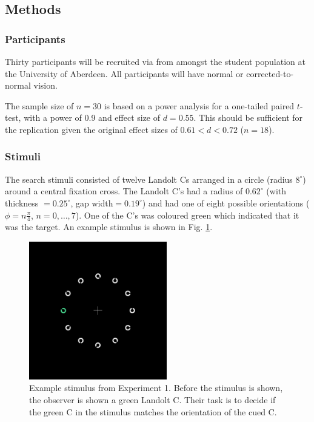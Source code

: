 \documentclass[smallextended]{svjour3}       %
\begin{document}
\subsection{Methods}

\subsubsection{Participants}

Thirty participants will be recruited via from amongst the student population at the University of Aberdeen. All participants will have normal or corrected-to-normal vision. 

The sample size of $n=30$ is based on a power analysis for a one-tailed paired $t$-test, with a power of 0.9 and effect size of $d=0.55$. This should be sufficient for the replication given the original effect sizes of $0.61<d<0.72$ ($n=18$).

\subsubsection{Stimuli}

The search stimuli consisted of twelve Landolt Cs arranged in a circle (radius $8^{\circ}$) around a central fixation cross. The Landolt C's had a radius of $0.62^{\circ}$ (with thickness $=0.25^{\circ}$, gap width$=0.19^{\circ}$) and had one of eight possible orientations ($\phi=n\frac{\pi}{4}$, $n=0,\ldots,7$). One of the C's was coloured green which indicated that it was the target. An example stimulus is shown in Fig. \ref{fig:exp1stimulus}.

\begin{figure}
\centering
\includegraphics[width=6cm]{figs/exStimExp1.png}
\caption{Example stimulus from Experiment 1. Before the stimulus is shown, the observer is shown a green Landolt C. Their task is to decide if the green C in the stimulus matches the orientation of the cued C.}
\label{fig:exp1stimulus}
\end{figure}
\end{document}
